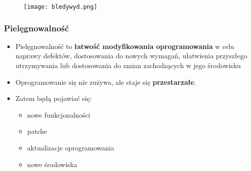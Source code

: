 \documentclass[../main.tex]{subfiles}
\begin{document}
    \begin{figure}[H]
        \texttt{[image: bledywyd.png]}
    \end{figure}

    \subsubsection{Pielęgnowalność}
    \begin{itemize}
        \item Pielęgnowalność to \textbf{łatwość modyfikowania oprogramowania} w celu naprawy defektów, dostosowania do nowych
        wymagań, ułatwienia przyszłego utrzymywania lub dostosowania do zmian zachodzących w jego środowisku
        \item Oprogramowanie się nie zużywa, ale staje się \textbf{przestarzałe}.
        \item Zatem będą pojawiać się:
        \begin{itemize}
            \item nowe funkcjonalności
            \item patche
            \item aktualizacje oprogramowania
            \item nowe środowiska
        \end{itemize}
    \end{itemize}
\end{document}
